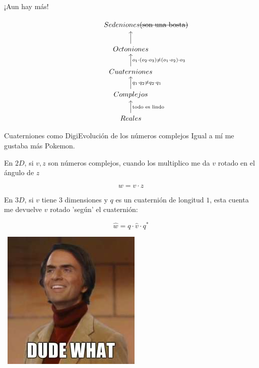 \documentclass[10pt]{beamer}
\begin{document}
\begin{frame}{¡Aun hay más!}

\begin{equation}
\begin{tikzcd}
\ \ \ \ \ \ \ \ \ \ \ \ \ Sedeniones \text{\sout{(son una bosta)}}\\
Octoniones \arrow{u} \\
Cuaterniones \arrow[u, "o_1 \cdot (o_2 \cdot o_3) \neq (o_1 \cdot o_2) \cdot o_3"'] \\
Complejos  \arrow[u, "q_1 \cdot q_2 \neq q_2 \cdot q_1"', u] \\
Reales \arrow[u, "\text{todo es lindo}"'] 
\end{tikzcd}
\end{equation}


\end{frame}



\begin{frame}{Cuaterniones como DigiEvolución de los números complejos}
\tiny{Igual a mí me gustaba más Pokemon.} \bigskip

\normalsize


En $2D$, si $v,z$ son números complejos, cuando los multiplico me da $v$ rotado en el ángulo de $z$

$$w = v \cdot z$$  \bigskip


En $3D$, si $v$ tiene 3 dimensiones y $q$ es un cuaternión de longitud $1$, esta cuenta me devuelve $v$ rotado 'según' el cuaternión:

$$\hat{w} = q \cdot \hat{v} \cdot q^*$$ 

\hbox{\hspace{8.5cm} \includegraphics[scale=0.18]{carl-sagan-dude-what.jpg}}



\end{frame}
\end{document}
